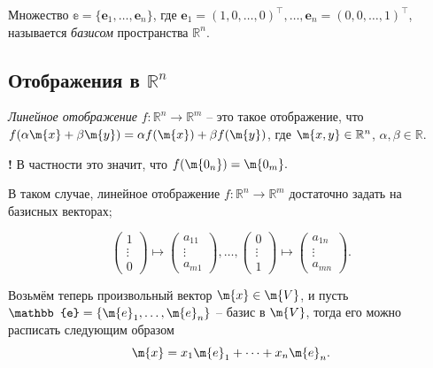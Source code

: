 Множество $\mathbb{e} = \{\mathbf{e}_1, \ldots, \mathbf{e}_n\}$, где $\mathbf{e}_1 = (1,0, \ldots, 0)^\top, \ldots, \mathbf{e}_n = (0,0,\ldots, 1)^\top$, называется \textit{базисом} пространства $\mathbb{R}^n.$

\subsection{Отображения в $\mathbb{R}^n$}

\begin{definition}
 \textit{Линейное отображение} $f:\mathbb{R}^n \to \mathbb{R}^m$ -- это такое отображение, что $f(\alpha \m{x} +\beta \m{y} ) = \alpha f(\m{x}) +\beta f(\m{y})$, где $\m{x,y} \in \mathbb{R}^n$, $\alpha, \beta \in \mathbb{R}.$     
\end{definition}

\begin{mydangerr}{\bf !}
    В частности это значит, что $f(\m{0_n}) = \m{0_m}.$
\end{mydangerr}

В таком случае, линейное отображение $f:\mathbb{R}^n \to \mathbb{R}^m$ достаточно задать на базисных векторах;

\[
 \begin{pmatrix}
     1 \\ \vdots \\ 0
 \end{pmatrix} \mapsto \begin{pmatrix}
     a_{11} \\ \vdots \\ a_{m1}
 \end{pmatrix}, \ldots, \begin{pmatrix}
     0 \\ \vdots \\ 1
 \end{pmatrix} \mapsto \begin{pmatrix}
     a_{1n} \\ \vdots \\ a_{mn}
 \end{pmatrix}.
\]

Возьмём теперь произвольный вектор $\m{x} \in \m{V}$, и пусть $\mathbb{e} =  \{\m{e}_1,\ldots, \m{e}_n\}$ -- базис в $\m{V}$, тогда его можно расписать следующим образом
\[
 \m{x} = x_1 \m{e}_1 + \cdots + x_n \m{e}_n.
\]


